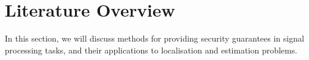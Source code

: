 \documentclass[twocolumn]{autart}
\begin{document}
\section{Literature Overview}
In this section, we will discuss methods for providing security guarantees in signal processing tasks, and their applications to localisation and estimation problems.

% 
% 
\end{document}
